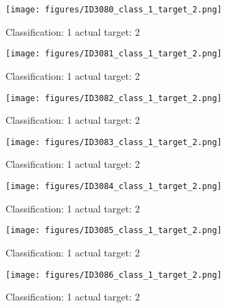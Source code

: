 \begin{figure}[h!]
\begin{center}
\texttt{[image: figures/ID3080\_class\_1\_target\_2.png]}
\end{center}
\caption{ Classification: 1 actual target: 2}
\label{fig:ID3080_class_1_target_2}
\end{figure}
\begin{figure}[h!]
\begin{center}
\texttt{[image: figures/ID3081\_class\_1\_target\_2.png]}
\end{center}
\caption{ Classification: 1 actual target: 2}
\label{fig:ID3081_class_1_target_2}
\end{figure}
\begin{figure}[h!]
\begin{center}
\texttt{[image: figures/ID3082\_class\_1\_target\_2.png]}
\end{center}
\caption{ Classification: 1 actual target: 2}
\label{fig:ID3082_class_1_target_2}
\end{figure}
\begin{figure}[h!]
\begin{center}
\texttt{[image: figures/ID3083\_class\_1\_target\_2.png]}
\end{center}
\caption{ Classification: 1 actual target: 2}
\label{fig:ID3083_class_1_target_2}
\end{figure}
\begin{figure}[h!]
\begin{center}
\texttt{[image: figures/ID3084\_class\_1\_target\_2.png]}
\end{center}
\caption{ Classification: 1 actual target: 2}
\label{fig:ID3084_class_1_target_2}
\end{figure}
\begin{figure}[h!]
\begin{center}
\texttt{[image: figures/ID3085\_class\_1\_target\_2.png]}
\end{center}
\caption{ Classification: 1 actual target: 2}
\label{fig:ID3085_class_1_target_2}
\end{figure}
\begin{figure}[h!]
\begin{center}
\texttt{[image: figures/ID3086\_class\_1\_target\_2.png]}
\end{center}
\caption{ Classification: 1 actual target: 2}
\label{fig:ID3086_class_1_target_2}
\end{figure}
